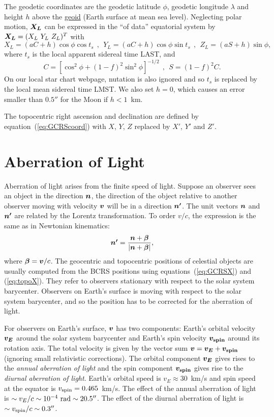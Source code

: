 \documentclass[12pt]{article}
\newcommand \beq {\begin{equation}}
\newcommand \eeq {\end{equation}}
\newcommand{\ve}[1]{\mbox{\boldmath $#1$}}
\begin{document}
The geodetic coordinates are the geodetic latitude $\phi$, geodetic longitude $\lambda$ and 
height $h$ above the \href{https://en.wikipedia.org/wiki/Geoid}{geoid} 
(Earth surface at mean sea level). Neglecting polar motion, $\ve{X_L}$ can be 
expressed in the ``of data'' equatorial system by $\ve{X_L}=(X_L\ Y_L\ Z_L)^T$ with 
\beq
 X_L = (aC + h)\cos \phi \cos t_s \ \ , \ \ 
 Y_L = (aC + h)\cos \phi \sin t_s \ \ , \ \ 
 Z_L = (aS + h) \sin \phi , 
\label{eq:XL}
\eeq
where $t_s$ is the local apparent sidereal time LAST, and 
\beq
  C = [\cos^2 \phi + (1-f)^2 \sin^2 \phi]^{-1/2} \ \ , \ \ 
  S = (1-f)^2 C .
\label{eq:topoCS}
\eeq
On our local star chart webpage, nutation is also ignored and so $t_s$ 
is replaced by the local mean sidereal time LMST. We also set $h=0$, which 
causes an error smaller than $0.5''$ for the Moon if $h<1$~km. 

The topocentric right ascension and declination are defined by 
equation~(\ref{eq:GCRScoord}) with $X$, $Y$, $Z$ replaced by $X'$, $Y'$ and 
$Z'$.

\section{Aberration of Light} 

Aberration of light arises from the finite speed of light. Suppose an observer 
sees an object in the direction $\ve{n}$, the direction of the object 
relative to another observer moving with velocity $\ve{v}$ will be in 
a direction $\ve{n'}$. The unit vectors $\ve{n}$ and $\ve{n'}$ are related 
by the Lorentz transformation. To order $v/c$, the expression is the same as 
in Newtonian kinematics:
\beq
  \ve{n'} = \frac{\ve{n} + \ve{\beta}}{|\ve{n} + \ve{\beta}|} ,
\label{eq:aberration}
\eeq
where $\ve{\beta} = \ve{v}/c$. The geocentric and topocentric positions 
of celestial objects are usually computed from the BCRS positions 
using equations~(\ref{eq:GCRSX}) and (\ref{eq:topoX}). They refer 
to observers stationary with respect to the solar system barycenter. 
Observers on Earth's surface is moving with respect to the solar system barycenter, 
and so the position has to be corrected for the aberration of light. 

For observers on Earth's surface, $\ve{v}$ has two components: Earth's 
orbital velocity $\ve{v_E}$ around the solar system barycenter 
and Earth's spin velocity $\ve{v_{\rm spin}}$ around its rotation axis. 
The total velocity is given by the vector sum 
$\ve{v}=\ve{v_E} + \ve{v_{\rm spin}}$ (ignoring small relativistic 
corrections). The orbital component $\ve{v_E}$ gives rises to the 
{\em annual aberration of light} and the spin component $\ve{v_{\rm spin}}$ 
gives rise to the {\em diurnal aberration of light}. Earth's orbital 
speed is $v_E \approx 30$~km/s and spin speed at the equator is 
$v_{\rm spin}=0.465$~km/s. The effect of the annual aberration of light is 
$\sim v_E/c \sim 10^{-4}~{\rm rad}\sim 20.5''$. The effect of the 
diurnal aberration of light is $\sim v_{\rm spin}/c \sim 0.3''$.
\end{document}

